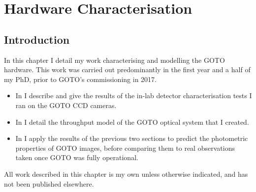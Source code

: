 \chapter{Hardware Characterisation}
\label{chap:hardware}
\chaptoc{}


\newpage
\section{Introduction}
\label{sec:hardware_intro}
\begin{colsection}

In this chapter I detail my work characterising and modelling the GOTO hardware. This work was carried out predominantly in the first year and a half of my PhD, prior to GOTO's commissioning in 2017.
%
\begin{itemize}
    \item In  I describe and give the results of the in-lab detector characterisation tests I ran on the GOTO CCD cameras.
    \item In  I detail the throughput model of the GOTO optical system that I created.
    \item In  I apply the results of the previous two sections to predict the photometric properties of GOTO images, before comparing them to real observations taken once GOTO was fully operational.
\end{itemize}
%
All work described in this chapter is my own unless otherwise indicated, and has not been published elsewhere.

\end{colsection}


\newpage
